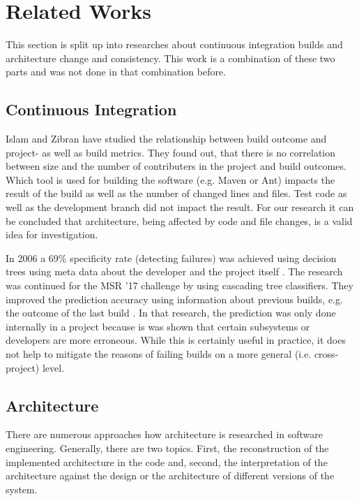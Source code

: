 \documentclass[conference]{IEEEtran}
\begin{document}
\section{Related Works}

This section is split up into researches about continuous integration builds and architecture change and consistency. This work is a combination of these two parts and was not done in that combination before. 

\subsection{Continuous Integration}

Islam and Zibran \cite{FailsCorr} have studied the relationship between build outcome and project- as well as build metrics. They found out, that there is no correlation between size and the number of contributers in the project and build outcomes. Which tool is used for building the software (e.g. Maven or Ant) impacts the result of the build as well as the number of changed lines and files. Test code as well as the development branch did not impact the result. For our research it can be concluded that architecture, being affected by code and file changes, is a valid idea for investigation. 

In 2006 a 69\% specificity rate (detecting failures) was achieved using decision trees using meta data about the developer and the project itself \cite{Pred-Tree}.
The research was continued for the MSR '17 challenge by using cascading tree classifiers. They improved the prediction accuracy using information about previous builds, e.g. the outcome of the last build \cite{Pred-Cascade}. 
In that research, the prediction was only done internally in a project because is was shown that certain subsystems or developers are more erroneous. While this is certainly useful in practice, it does not help to mitigate the reasons of failing builds on a more general (i.e. cross-project) level.

\subsection{Architecture}

There are numerous approaches how architecture is researched in software engineering. Generally, there are two topics. First, the reconstruction of the implemented architecture in the code and, second, the interpretation of the architecture against the design or the architecture of different versions of the system.
\end{document}

